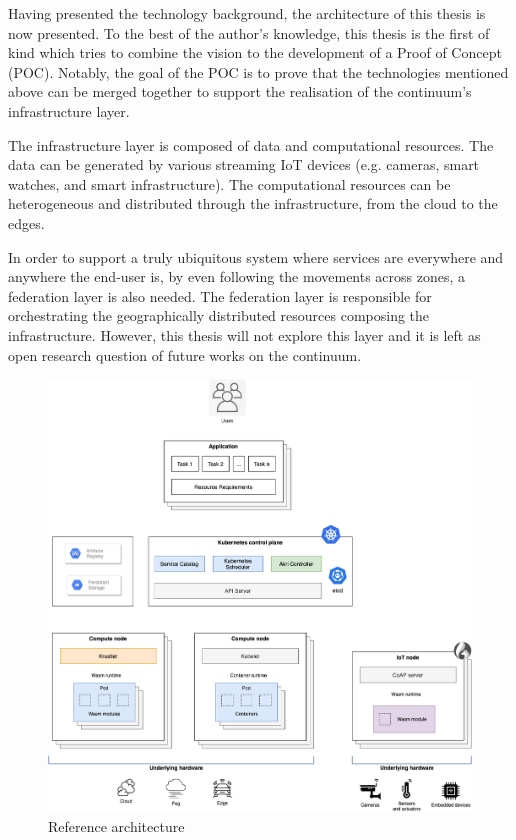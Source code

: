 Having presented the technology background, the architecture of this thesis is now presented. To the best of the author's knowledge, this thesis is the first of kind which tries to combine the vision to the development of a Proof of Concept (POC). Notably, the goal of the POC is to prove that the technologies mentioned above can be merged together to support the realisation of the continuum's infrastructure layer. 

The infrastructure layer is composed of data and computational resources. The data can be generated by various streaming IoT devices (e.g. cameras, smart watches, and smart infrastructure). The computational resources can be heterogeneous and distributed through the infrastructure, from the cloud to the edges.

In order to support a truly ubiquitous system where services are everywhere and anywhere the end-user is, by even following the movements across zones, a federation layer is also needed. The federation layer is responsible for orchestrating the geographically distributed resources composing the infrastructure. However, this thesis will not explore this layer and it is left as open research question of future works on the continuum.

\begin{figure}[h]
\centering
\includegraphics[width=\columnwidth]{figures/architecture}
\caption{Reference architecture \label{fig:architecture}}
\end{figure}

